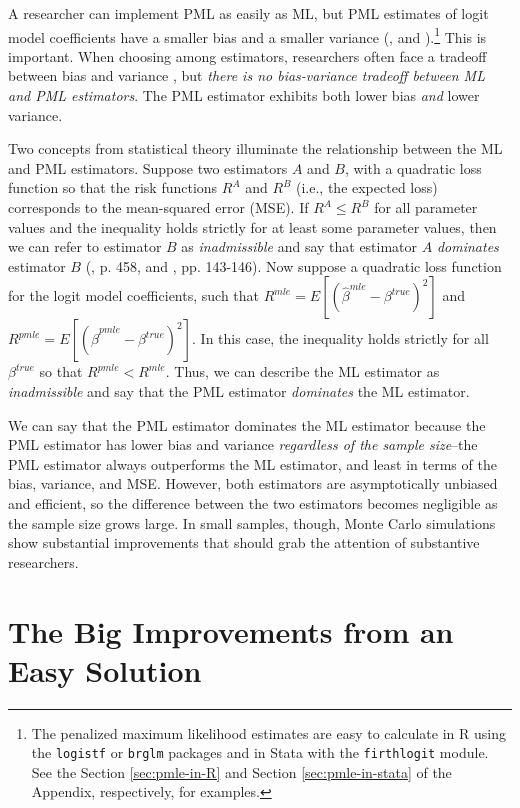 \documentclass[12pt]{article}
\begin{document}
A researcher can implement PML as easily as ML, but PML estimates of logit model coefficients have a smaller bias \citep{Firth1993} and a smaller variance (\citealt[p. 49]{Kosmidis2007}, and \citealt{Copas1988}).\footnote{The penalized maximum likelihood estimates are easy to calculate in R using the \texttt{logistf} or \texttt{brglm} packages and in Stata with the \texttt{firthlogit} module. 
See the Section \ref{sec:pmle-in-R} and Section \ref{sec:pmle-in-stata} of the Appendix, respectively, for examples.}
This is important.
When choosing among estimators, researchers often face a tradeoff between bias and variance \citep[pp. 37-38]{HastieTibshiraniFriedman2013}, but \textit{there is no bias-variance tradeoff between ML and PML estimators}.
The PML estimator exhibits both lower bias \textit{and} lower variance.

Two concepts from statistical theory illuminate the relationship between the ML and PML estimators. 
Suppose two estimators $A$ and $B$, with a quadratic loss function so that the risk functions $R^A$ and $R^B$ (i.e., the expected loss) corresponds to the mean-squared error (MSE). 
If $R^A \leq R^B$ for all parameter values and the inequality holds strictly for at least some parameter values, then we can refer to estimator $B$ as \textit{inadmissible} and say that estimator $A$ \textit{dominates} estimator $B$ (\citealt{DeGrootSchervish2012}, p. 458, and \citealt{LeonardHsu1999}, pp. 143-146). 
Now suppose a quadratic loss function for the logit model coefficients, such that $R^{mle} = E[(\hat{\beta}^{mle} - \beta^{true})^2]$ and $R^{pmle} = E[(\hat{\beta}^{pmle} - \beta^{true})^2]$. 
In this case, the inequality holds strictly for all $\beta^{true}$ so that $R^{pmle} < R^{mle}$. Thus, we can describe the ML estimator as \textit{inadmissible} and say that the PML estimator \textit{dominates} the ML estimator.

We can say that the PML estimator dominates the ML estimator because the PML estimator has lower bias and variance \textit{regardless of the sample size}--the PML estimator always outperforms the ML estimator, and least in terms of the bias, variance, and MSE.
However, both estimators are asymptotically unbiased and efficient, so the difference between the two estimators becomes negligible as the sample size grows large.
In small samples, though, Monte Carlo simulations show substantial improvements that should grab the attention of substantive researchers.

\section*{The Big Improvements from an Easy Solution}
\end{document}

